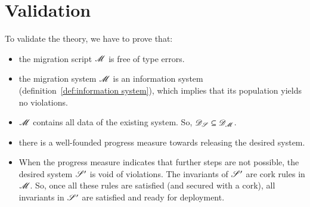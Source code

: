 \documentclass{elsarticle}
\begin{document}
\section{Validation}
   To validate the theory, we have to prove that:
\begin{itemize}
   \item the migration script $\mathscr{M}$ is free of type errors.
   \item the migration system $\mathscr{M}$ is an information system (definition~\ref{def:information system}),
         which implies that its population yields no violations.
   \item $\mathscr{M}$ contains all data of the existing system. So, $\mathscr{D}_{\mathscr{S}}\subseteq\mathscr{D}_{\mathscr{M}}$.
   \item there is a well-founded progress measure towards releasing the desired system.
   \item When the progress measure indicates that further steps are not possible, the desired system $\mathscr{S}'$ is void of violations.
   The invariants of $\mathscr{S}'$ are cork rules in $\mathscr{M}$.
   So, once all these rules are satisfied (and secured with a cork),
   all invariants in $\mathscr{S}'$ are satisfied and ready for deployment.
\end{itemize}
\end{document}
